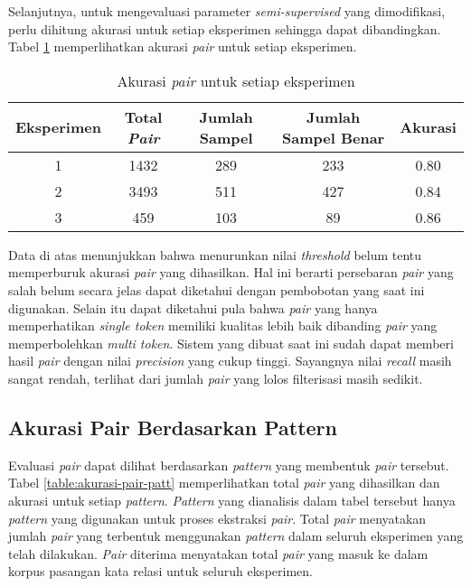 Selanjutnya, untuk mengevaluasi parameter \textit{semi-supervised} yang dimodifikasi, perlu dihitung akurasi untuk setiap eksperimen sehingga dapat dibandingkan. Tabel \ref{table:akurasi-all} memperlihatkan akurasi \textit{pair} untuk setiap eksperimen.

\begin{table}
  \centering
  \caption{Akurasi \textit{pair} untuk setiap eksperimen}
  \label{table:akurasi-all}
  \begin{tabular}{|c|c|c|c|c|}
  \hline
  Eksperimen & Total \textit{Pair} & Jumlah Sampel & Jumlah Sampel Benar & Akurasi \\ \hline
  1 & 1432 & 289 & 233 & 0.80 \\ \hline
  2 & 3493 & 511 & 427 & 0.84 \\ \hline
  3 & 459  & 103 & 89  & 0.86 \\ \hline
  \end{tabular} 
\end{table}

Data di atas menunjukkan bahwa menurunkan nilai \textit{threshold} belum tentu memperburuk akurasi \textit{pair} yang dihasilkan. Hal ini berarti persebaran \textit{pair} yang salah belum secara jelas dapat diketahui dengan pembobotan yang saat ini digunakan. Selain itu dapat diketahui pula bahwa \textit{pair} yang hanya memperhatikan \textit{single token} memiliki kualitas lebih baik dibanding \textit{pair} yang memperbolehkan \textit{multi token}. Sistem yang dibuat saat ini sudah dapat memberi hasil \textit{pair} dengan nilai \textit{precision} yang cukup tinggi. Sayangnya nilai \textit{recall} masih sangat rendah, terlihat dari jumlah \textit{pair} yang lolos filterisasi masih sedikit.

\subsection{Akurasi Pair Berdasarkan Pattern}
Evaluasi \textit{pair} dapat dilihat berdasarkan \textit{pattern} yang membentuk \textit{pair} tersebut. Tabel \ref{table:akurasi-pair-patt} memperlihatkan total \textit{pair} yang dihasilkan dan akurasi untuk setiap \textit{pattern}. \textit{Pattern} yang dianalisis dalam tabel tersebut hanya \textit{pattern} yang digunakan untuk proses ekstraksi \textit{pair}. Total \textit{pair} menyatakan jumlah \textit{pair} yang terbentuk menggunakan \textit{pattern} dalam seluruh eksperimen yang telah dilakukan. \textit{Pair} diterima menyatakan total \textit{pair} yang masuk ke dalam korpus pasangan kata relasi untuk seluruh eksperimen.

